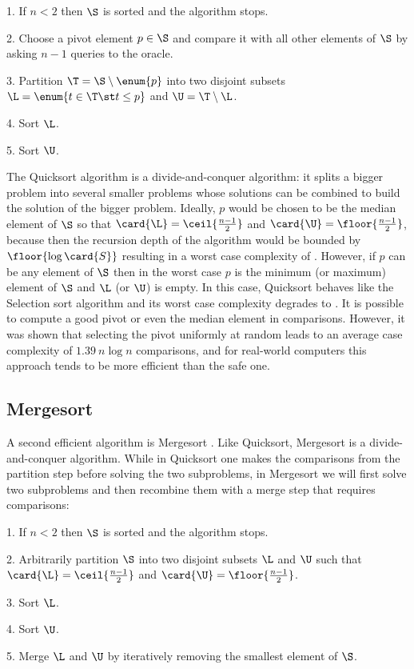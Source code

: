\begin{algorithm}
\item[1.] If \(n < 2\) then \(\S\) is sorted and the algorithm stops.
\item[2.] Choose a pivot element \(p \in \S\) and compare it with all other
elements of \(\S\) by asking \(n - 1\) queries to the oracle.
\item[3.] Partition \(\T = \S \setminus \enum{p}\) into two disjoint subsets
\(\L = \enum{t \in \T \st t \le p}\) and \(\U = \T \setminus \L\).
\item[4.] Sort \(\L\).
\item[5.] Sort \(\U\).
\end{algorithm}

The Quicksort algorithm is a divide-and-conquer algorithm: it splits a
bigger problem into several smaller problems whose solutions can be combined
to build the solution of the bigger problem. Ideally, \(p\) would be chosen to
be the median element of \(\S\) so that \(\card{\L} =
\ceil{\frac{n-1}{2}}\) and \(\card{\U} =
\floor{\frac{n-1}{2}}\), because then the recursion depth of the
algorithm would be bounded by \(\floor{\log \card{S}}\) resulting in a worst
case complexity of . However, if \(p\) can be any element of
\(\S\) then in the worst case \(p\) is the minimum (or maximum) element of
\(\S\) and \(\L\) (or \(\U\)) is empty. In this case, Quicksort behaves like
the Selection sort algorithm and its worst case complexity degrades to
. It is possible \cite{blum:1973} to compute a good pivot or even the
median element in  comparisons. However, it was shown \cite{hoare:1962} that
selecting the pivot uniformly at random leads to an average case complexity of
\(1.39~n \log n\) comparisons, and for real-world computers this approach tends
to be more efficient than the safe one.

\subsection*{Mergesort}

A second efficient algorithm is Mergesort
\cite{goldstine:1948,leiserson:2001}. Like Quicksort, Mergesort is a
divide-and-conquer algorithm. While in Quicksort one makes the comparisons from
the partition step before solving the two subproblems, in Mergesort we will
first solve two subproblems and then recombine them with a merge step that
requires  comparisons:

\begin{algorithm}
\item[1.] If \(n < 2\) then \(\S\) is sorted and the algorithm stops.
\item[2.] Arbitrarily partition \(\S\) into two disjoint subsets \(\L\) and
\(\U\) such that \(\card{\L} = \ceil{\frac{n-1}{2}}\) and \(\card{\U} =
\floor{\frac{n-1}{2}}\).
\item[3.] Sort \(\L\).
\item[4.] Sort \(\U\).
\item[5.] Merge \(\L\) and \(\U\) by iteratively removing the smallest element
of \(\S\).
\end{algorithm}

